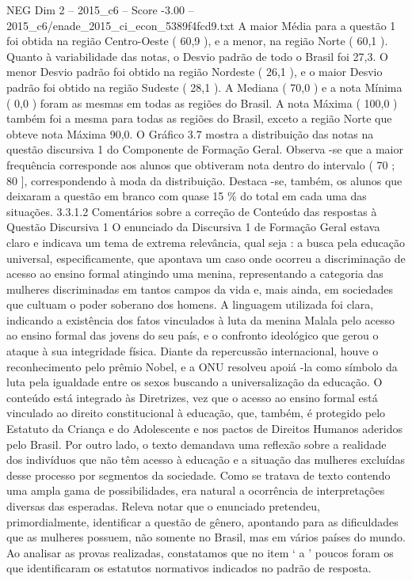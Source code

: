 \begin{textsample}{NEG Dim 2 – 2015\_c6 – Score -3.00 – 2015\_c6/enade\_2015\_ci\_econ\_5389f4fcd9.txt}
A maior Média para a questão 1 foi obtida na região Centro-Oeste ( 60,9 ), e a menor, na região Norte ( 60,1 ).
Quanto à variabilidade das notas, o Desvio padrão de todo o Brasil foi 27,3.
O menor Desvio padrão foi obtido na região Nordeste ( 26,1 ), e o maior Desvio padrão foi obtido na região Sudeste ( 28,1 ).
A Mediana ( 70,0 ) e a nota Mínima ( 0,0 ) foram as mesmas em todas as regiões do Brasil.
A nota Máxima ( 100,0 ) também foi a mesma para todas as regiões do Brasil, exceto a região Norte que obteve nota Máxima 90,0.
O Gráfico 3.7 mostra a distribuição das notas na questão discursiva 1 do Componente de Formação Geral.
Observa -se que a maior frequência corresponde aos alunos que obtiveram nota dentro do intervalo ( 70 ; 80 ], correspondendo à moda da distribuição.
Destaca -se, também, os alunos que deixaram a questão em branco com quase 15 \% do total em cada uma das situações. 3.3.1.2 Comentários sobre a correção de Conteúdo das respostas à Questão Discursiva 1 O enunciado da Discursiva 1 de Formação Geral estava claro e indicava um tema de extrema relevância, qual seja : a busca pela educação universal, especificamente, que apontava um caso onde ocorreu a discriminação de acesso ao ensino formal atingindo uma menina, representando a categoria das mulheres discriminadas em tantos campos da vida e, mais ainda, em sociedades que cultuam o poder soberano dos homens.
A linguagem utilizada foi clara, indicando a existência dos fatos vinculados à luta da menina Malala pelo acesso ao ensino formal das jovens do seu país, e o confronto ideológico que gerou o ataque à sua integridade física.
Diante da repercussão internacional, houve o reconhecimento pelo prêmio Nobel, e a ONU resolveu apoiá -la como símbolo da luta pela igualdade entre os sexos buscando a universalização da educação.
O conteúdo está integrado às Diretrizes, vez que o acesso ao ensino formal está vinculado ao direito constitucional à educação, que, também, é protegido pelo Estatuto da Criança e do Adolescente e nos pactos de Direitos Humanos aderidos pelo Brasil.
Por outro lado, o texto demandava uma reflexão sobre a realidade dos indivíduos que não têm acesso à educação e a situação das mulheres excluídas desse processo por segmentos da sociedade.
Como se tratava de texto contendo uma ampla gama de possibilidades, era natural a ocorrência de interpretações diversas das esperadas.
Releva notar que o enunciado pretendeu, primordialmente, identificar a questão de gênero, apontando para as dificuldades que as mulheres possuem, não somente no Brasil, mas em vários países do mundo.
Ao analisar as provas realizadas, constatamos que no item ‘ a ’ poucos foram os que identificaram os estatutos normativos indicados no padrão de resposta.

\end{textsample}
